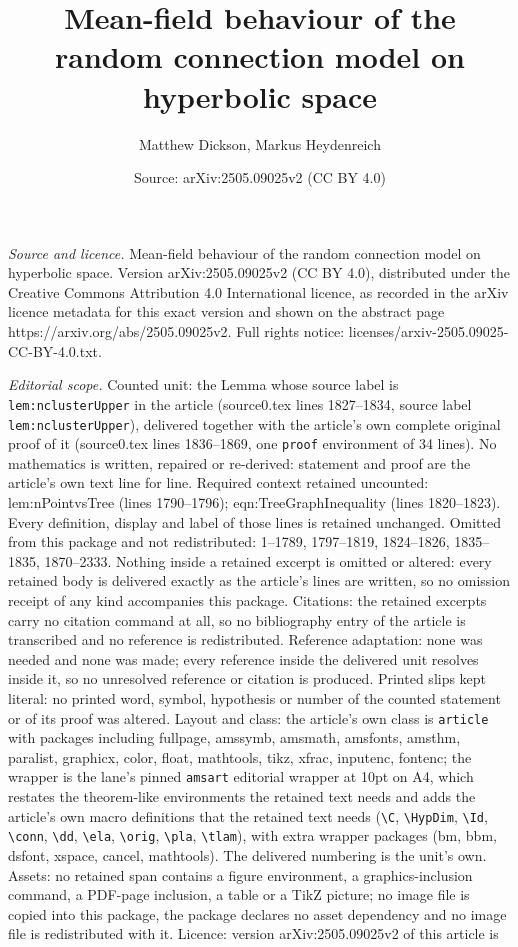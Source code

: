 \documentclass[10pt,a4paper]{amsart}
\title[Mean-field behaviour of the random connection model on hyper]{Mean-field behaviour of the random connection model on hyperbolic space}
\author{Matthew Dickson, Markus Heydenreich}
\date{Source: arXiv:2505.09025v2 (CC BY 4.0)}
\begin{document}
\maketitle

\noindent\emph{Source and licence.} Mean-field behaviour of the random connection model on hyperbolic space. Version arXiv:2505.09025v2 (CC BY 4.0), distributed under the Creative Commons Attribution 4.0 International licence, as recorded in the arXiv licence metadata for this exact version and shown on the abstract page https://arxiv.org/abs/2505.09025v2. Full rights notice: licenses/arxiv-2505.09025-CC-BY-4.0.txt.\par\smallskip

\noindent\textit{Editorial scope.} Counted unit: the Lemma whose source label is \texttt{lem:nclusterUpper} in the article (source0.tex lines 1827--1834, source label \texttt{lem:nclusterUpper}), delivered together with the article's own complete original proof of it (source0.tex lines 1836--1869, one \texttt{proof} environment of 34 lines). No mathematics is written, repaired or re-derived: statement and proof are the article's own text line for line. Required context retained uncounted: lem:nPointvsTree (lines 1790--1796); eqn:TreeGraphInequality (lines 1820--1823). Every definition, display and label of those lines is retained unchanged. Omitted from this package and not redistributed: 1--1789, 1797--1819, 1824--1826, 1835--1835, 1870--2333. Nothing inside a retained excerpt is omitted or altered: every retained body is delivered exactly as the article's lines are written, so no omission receipt of any kind accompanies this package. Citations: the retained excerpts carry no citation command at all, so no bibliography entry of the article is transcribed and no reference is redistributed. Reference adaptation: none was needed and none was made; every reference inside the delivered unit resolves inside it, so no unresolved reference or citation is produced. Printed slips kept literal: no printed word, symbol, hypothesis or number of the counted statement or of its proof was altered. Layout and class: the article's own class is \texttt{article} with packages including fullpage, amssymb, amsmath, amsfonts, amsthm, paralist, graphicx, color, float, mathtools, tikz, xfrac, inputenc, fontenc; the wrapper is the lane's pinned \texttt{amsart} editorial wrapper at 10pt on A4, which restates the theorem-like environments the retained text needs and adds the article's own macro definitions that the retained text needs (\texttt{\textbackslash C}, \texttt{\textbackslash HypDim}, \texttt{\textbackslash Id}, \texttt{\textbackslash conn}, \texttt{\textbackslash dd}, \texttt{\textbackslash ela}, \texttt{\textbackslash orig}, \texttt{\textbackslash pla}, \texttt{\textbackslash tlam}), with extra wrapper packages (bm, bbm, dsfont, xspace, cancel, mathtools). The delivered numbering is the unit's own. Assets: no retained span contains a figure environment, a graphics-inclusion command, a PDF-page inclusion, a table or a TikZ picture; no image file is copied into this package, the package declares no asset dependency and no image file is redistributed with it. Licence: version arXiv:2505.09025v2 of this article is 
\end{document}
